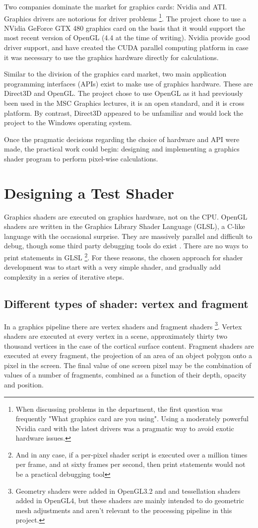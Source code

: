 \documentclass[MSc,paper=a4,pagesize=auto]{icldt}
\begin{document}
Two companies dominate the market for graphics cards: Nvidia and ATI. Graphics drivers are notorious for driver problems \footnote{When discussing problems in the department, the first question was frequently "What graphics card are you using". Using a moderately powerful Nvidia card with the latest drivers was a pragmatic way to avoid exotic hardware issues.}. The project chose to use a NVidia GeForce GTX 480 graphics card on the basis that it would support the most recent version of OpenGL (4.4 at the time of writing). Nvidia provide good driver support, and have created the CUDA parallel computing platform in case it was necessary to use the graphics hardware directly for calculations.

Similar to the division of the graphics card market, two main application programming interfaces (APIs) exist to make use of graphics hardware. These are Direct3D and OpenGL. The project chose to use OpenGL as it had previously been used in the MSC Graphics lectures, it is an open standard, and it is cross platform. By contrast, Direct3D appeared to be unfamiliar and would lock the project to the Windows operating system.

Once the pragmatic decisions regarding the choice of hardware and API were made, the practical work could begin: designing and implementing a graphics shader program to perform pixel-wise calculations.

\section{Designing a Test Shader}
Graphics shaders are executed on graphics hardware, not on the CPU. OpenGL shaders are written in the Graphics Library Shader Language (GLSL), a C-like language with the occasional surprise. They are massively parallel and difficult to debug, though some third party debugging tools do exist \cite{glslDevil}. There are no ways to print statements in GLSL \footnote{And in any case, if a per-pixel shader script is executed over a million times per frame, and at sixty frames per second, then print statements would not be a practical debugging tool}. For these reasons, the chosen approach for shader development was to start with a very simple shader, and gradually add complexity in a series of iterative steps. 

\subsection{Different types of shader: vertex and fragment}
In a graphics pipeline there are vertex shaders and fragment shaders \footnote{Geometry shaders were added in OpenGL3.2 and and tessellation shaders added in OpenGL4, but these shaders are mainly intended to do geometric mesh adjustments and aren't relevant to the processing pipeline in this project.}. Vertex shaders are executed at every vertex in a scene, approximately thirty two thousand vertices in the case of the cortical surface content. Fragment shaders are executed at every fragment, the projection of an area of an object polygon onto a pixel in the screen. The final value of one screen pixel may be the combination of values of a number of fragments, combined as a function of their depth, opacity and position.
\end{document}
